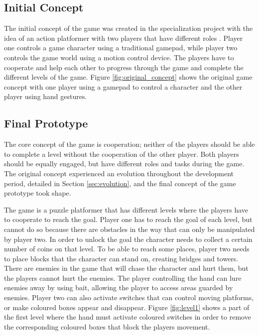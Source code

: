 \subsection{Initial Concept}
The initial concept of the game was created in the specialization project with the idea of an action platformer with two players that have different roles \cite{hovind2015alternative}. Player one controls a game character using a traditional gamepad, while player two controls the game world using a motion control device. The players have to cooperate and help each other to progress through the game and complete the different levels of the game. Figure \ref{fig:original_concept} shows the original game concept with one player using a gamepad to control a character and the other player using hand gestures.



\subsection{Final Prototype}
\label{sec:concept_final}
The core concept of the game is cooperation; neither of the players should be able to complete a level without the cooperation of the other player. Both players should be equally engaged, but have different roles and tasks during the game. The original concept experienced an evolution throughout the development period, detailed in Section \ref{sec:evolution}, and the final concept of the game prototype took shape. 

The game is a puzzle platformer that has different levels where the players have to cooperate to reach the goal. Player one has to reach the goal of each level, but cannot do so because there are obstacles in the way that can only be manipulated by player two. In order to unlock the goal the character needs to collect a certain number of coins on that level. To be able to reach some places, player two needs to place blocks that the character can stand on, creating bridges and towers. There are enemies in the game that will chase the character and hurt them, but the players cannot hurt the enemies. The player controlling the hand can lure enemies away by using bait, allowing the player to access areas guarded by enemies. Player two can also activate switches that can control moving platforms, or make coloured boxes appear and disappear. Figure \ref{fig:level1} shows a part of the first level where the hand must activate coloured switches in order to remove the corresponding coloured boxes that block the players movement.

